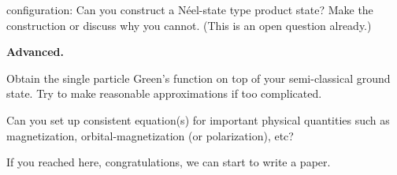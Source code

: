 \begin{problem}
\begin{enumext}[label = \Roman*.]
    configuration: Can you construct a N\'eel-state type product state? Make the
    construction or discuss why you cannot. (This is an open question already.)
    \item \textbf{Advanced.}
    \begin{enumext}[label = (\alph*)]
      \item Obtain the single particle Green's function on top of your
      semi-classical ground state. Try to make reasonable approximations if too
      complicated.
      \item Can you set up consistent equation(s) for important physical
      quantities such as magnetization, orbital-magnetization (or polarization),
      etc?
      \item If you reached here, congratulations, we can start to write a paper.
    \end{enumext}
  \end{enumext}
\end{problem}
